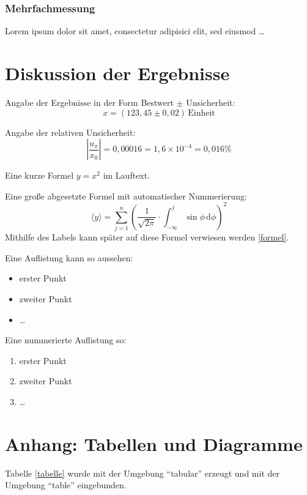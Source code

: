 \documentclass[11pt,a4paper]{article}
\begin{document}
\subsubsection{Mehrfachmessung}
\label{mehrfachmessung}
Lorem ipsum dolor sit amet, consectetur adipisici elit, sed eiusmod \dots



\section{Diskussion der Ergebnisse}
\label{diskussion}

Angabe der Ergebnisse in der Form Bestwert $\pm$ Unsicherheit: 
\[ 
 x = (123{,}45 \pm 0{,}02)\,\text{Einheit}
\]

Angabe der relativen Unsicherheit: 
\[
 \left| \frac{u_x}{x_0} \right| = 0{,}00016 = 1{,}6\times 10^{-4} = 0{,}016\%
\]

Eine kurze Formel $y=x^2$ im Lauftext. 

Eine große abgesetzte Formel mit automatischer Nummerierung: 
\begin{equation}
 \langle y \rangle = \sum_{j=1}^{n}{ \left( \frac{1}{\sqrt{2\pi}} \cdot \int_{-\infty}^{j}{ \sin{\phi} \,\text{d}\phi} \right)^2 } 
\label{formel}
\end{equation}
Mithilfe des Labels kann später auf diese Formel verwiesen werden \eqref{formel}.

Eine Auflistung kann so aussehen: 
\begin{itemize}
	\item erster Punkt
	\item zweiter Punkt
	\item \dots
\end{itemize}
	 
Eine nummerierte Auflistung so: 
\begin{enumerate}
	\item erster Punkt
	\item zweiter Punkt
	\item \dots
\end{enumerate}
	 
	

\section{Anhang: Tabellen und Diagramme}

Tabelle \ref{tabelle} wurde mit der Umgebung "`tabular"' erzeugt
und mit der Umgebung "`table"' eingebunden.  
\end{document}
